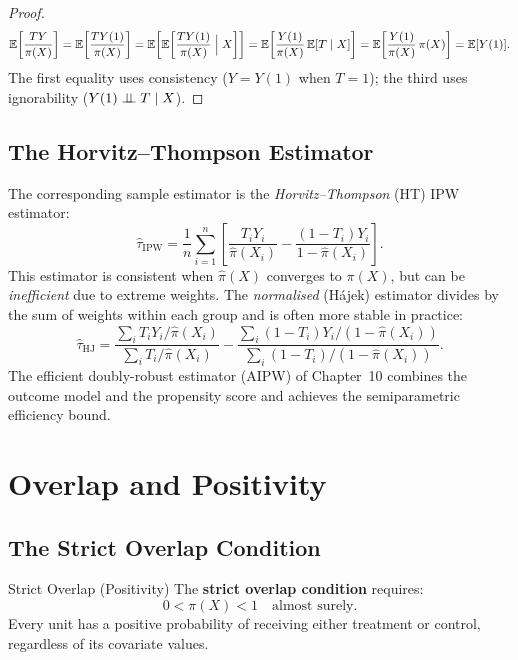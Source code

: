 \documentclass[master.tex]{subfiles}
\begin{document}
\begin{proof}
\[
  \mathbb{E}\!\left[\frac{T Y}{\pi(X)}\right]
  = \mathbb{E}\!\left[\frac{T Y(1)}{\pi(X)}\right]
  = \mathbb{E}\!\left[\mathbb{E}\!\left[\frac{T Y(1)}{\pi(X)} \;\Big|\; X\right]\right]
  = \mathbb{E}\!\left[\frac{Y(1)}{\pi(X)}\, \mathbb{E}[T \mid X]\right]
  = \mathbb{E}\!\left[\frac{Y(1)}{\pi(X)}\, \pi(X)\right]
  = \mathbb{E}[Y(1)].
\]
The first equality uses consistency ($Y = Y(1)$ when $T{=}1$);
the third uses ignorability ($Y(1) \perp\!\!\!\perp T \mid X$).
\end{proof}

\subsection{The Horvitz--Thompson Estimator}

The corresponding sample estimator is the \emph{Horvitz--Thompson}
(HT) IPW estimator:
\[
  \hat\tau_{\mathrm{IPW}}
  = \frac{1}{n}\sum_{i=1}^n
    \left[\frac{T_i Y_i}{\hat\pi(X_i)}
        - \frac{(1-T_i) Y_i}{1-\hat\pi(X_i)}\right].
\]
This estimator is consistent when $\hat\pi(X)$ converges to $\pi(X)$,
but can be \emph{inefficient} due to extreme weights.  The
\emph{normalised} (Hájek) estimator divides by the sum of weights
within each group and is often more stable in practice:
\[
  \hat\tau_{\mathrm{HJ}}
  = \frac{\sum_i T_i Y_i / \hat\pi(X_i)}
         {\sum_i T_i / \hat\pi(X_i)}
  - \frac{\sum_i (1-T_i) Y_i / (1-\hat\pi(X_i))}
         {\sum_i (1-T_i) / (1-\hat\pi(X_i))}.
\]
The efficient doubly-robust estimator (AIPW) of Chapter~10 combines the
outcome model and the propensity score and achieves the semiparametric
efficiency bound.

\section{Overlap and Positivity}

\subsection{The Strict Overlap Condition}

\begin{defn}{Strict Overlap (Positivity)}
\label{w6:defn:overlap}
The \textbf{strict overlap condition} requires:
\[
  0 < \pi(X) < 1 \quad \text{almost surely.}
\]
Every unit has a positive probability of receiving either treatment or
control, regardless of its covariate values.
\end{defn}
\end{document}
